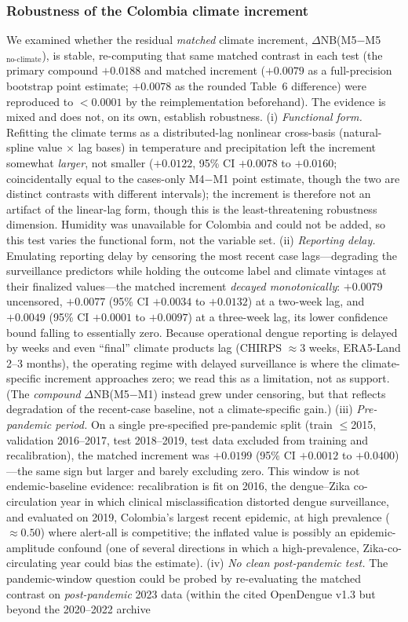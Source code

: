 \documentclass[11pt,a4paper]{article}
\begin{document}
\subsubsection*{Robustness of the Colombia climate increment}
We examined whether the residual \emph{matched} climate increment, $\Delta$NB(M5$-$M5$_{\text{no-climate}}$), is stable, re-computing that same matched contrast in each test (the primary compound $+0.0188$ and matched increment ($+0.0079$ as a full-precision bootstrap point estimate; $+0.0078$ as the rounded Table~6 difference) were reproduced to $<0.0001$ by the reimplementation beforehand). The evidence is mixed and does not, on its own, establish robustness. (i) \emph{Functional form.} Refitting the climate terms as a distributed-lag nonlinear cross-basis (natural-spline value $\times$ lag bases) in temperature and precipitation left the increment somewhat \emph{larger}, not smaller ($+0.0122$, 95\% CI $+0.0078$ to $+0.0160$; coincidentally equal to the cases-only M4$-$M1 point estimate, though the two are distinct contrasts with different intervals); the increment is therefore not an artifact of the linear-lag form, though this is the least-threatening robustness dimension. Humidity was unavailable for Colombia and could not be added, so this test varies the functional form, not the variable set. (ii) \emph{Reporting delay.} Emulating reporting delay by censoring the most recent case lags---degrading the surveillance predictors while holding the outcome label and climate vintages at their finalized values---the matched increment \emph{decayed monotonically}: $+0.0079$ uncensored, $+0.0077$ (95\% CI $+0.0034$ to $+0.0132$) at a two-week lag, and $+0.0049$ (95\% CI $+0.0001$ to $+0.0097$) at a three-week lag, its lower confidence bound falling to essentially zero. Because operational dengue reporting is delayed by weeks and even ``final'' climate products lag (CHIRPS $\approx$3 weeks, ERA5-Land 2--3 months), the operating regime with delayed surveillance is where the climate-specific increment approaches zero; we read this as a limitation, not as support. (The \emph{compound} $\Delta$NB(M5$-$M1) instead grew under censoring, but that reflects degradation of the recent-case baseline, not a climate-specific gain.) (iii) \emph{Pre-pandemic period.} On a single pre-specified pre-pandemic split (train $\le$2015, validation 2016--2017, test 2018--2019, test data excluded from training and recalibration), the matched increment was $+0.0199$ (95\% CI $+0.0012$ to $+0.0400$)---the same sign but larger and barely excluding zero. This window is not endemic-baseline evidence: recalibration is fit on 2016, the dengue--Zika co-circulation year in which clinical misclassification distorted dengue surveillance, and evaluated on 2019, Colombia's largest recent epidemic, at high prevalence ($\approx0.50$) where alert-all is competitive; the inflated value is possibly an epidemic-amplitude confound (one of several directions in which a high-prevalence, Zika-co-circulating year could bias the estimate). (iv) \emph{No clean post-pandemic test.} The pandemic-window question could be probed by re-evaluating the matched contrast on \emph{post-pandemic} 2023 data (within the cited OpenDengue v1.3 but beyond the 2020--2022 archive 
\end{document}
